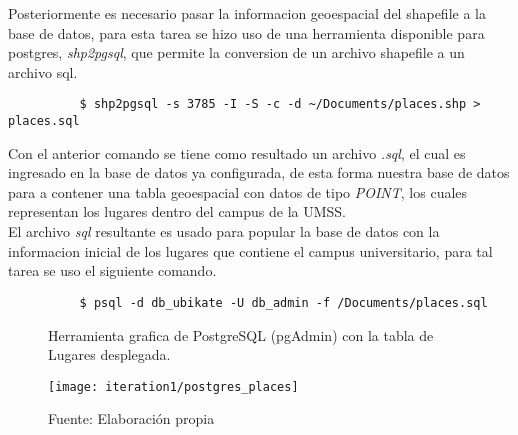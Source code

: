        Posteriormente es necesario pasar la informacion geoespacial del shapefile a la base de datos, para esta tarea se hizo uso de una herramienta disponible para postgres, \emph{shp2pgsql}, que permite la conversion de un archivo shapefile a un archivo sql.

        \begin{verbatim}
          $ shp2pgsql -s 3785 -I -S -c -d ~/Documents/places.shp > places.sql
        \end{verbatim}

        Con el anterior comando se tiene como resultado un archivo \emph{.sql}, el cual es ingresado en la base de datos ya configurada, de esta forma nuestra base de datos para a contener una tabla geoespacial con datos de tipo \emph{POINT}, los cuales representan los lugares dentro del campus de la UMSS.\\


        El archivo \emph{sql} resultante es usado para popular la base de datos con la informacion inicial de los lugares que contiene el campus universitario, para tal tarea se uso el siguiente comando.\\

        \begin{verbatim}
          $ psql -d db_ubikate -U db_admin -f /Documents/places.sql
        \end{verbatim}

        \begin{figure}[H]
          \begin{center}
            \caption{Herramienta grafica de PostgreSQL (pgAdmin) con la tabla de Lugares desplegada.}
            \label{fig:postgres_places}
            \texttt{[image: iteration1/postgres\_places]}
            \caption*{Fuente: Elaboración propia}
          \end{center}
        \end{figure}

